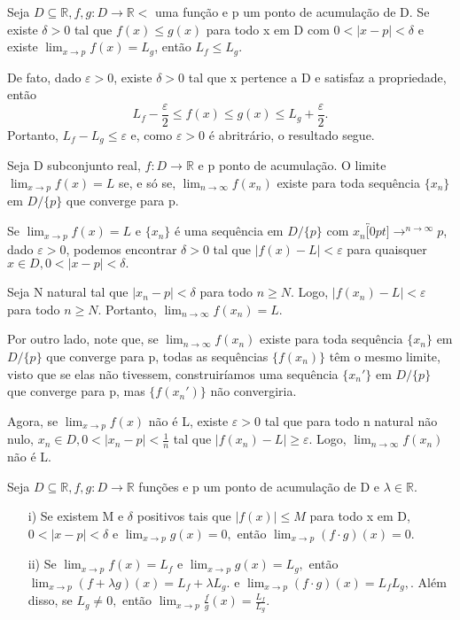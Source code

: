 \documentclass[analysis_notes.tex]{subfiles}
\begin{document}
\begin{theorem*}
	Seja $D\subseteq{\mathbb{R}}, f, g:D\rightarrow \mathbb{R}<$ uma fun\c c\~ao e p um ponto de acumula\c c\~ao de D. Se existe $\delta > 0$
	tal que $f(x)\leq{g(x)}$ para todo x em D com $0 <|x-p|<\delta$ e existe $\lim_{x\to p}f(x) = L_{g}$, ent\~ao $L_{f}\leq{L_{g}}.$
\end{theorem*}
\begin{proof*}
	De fato, dado $\varepsilon > 0$, existe $\delta > 0$ tal que x pertence a D e satisfaz a propriedade, ent\~ao
	$$
		L_{f} - \frac{\varepsilon}{2} \leq{f(x)}\leq{g(x)}\leq{L_{g}+\frac{\varepsilon}{2}.}
	$$
	Portanto, $L_{f}-L_{g}\leq{\varepsilon}$ e, como $\varepsilon > 0$ \'e abritr\'ario, o resultado segue. \qedsymbol
\end{proof*}
\begin{theorem*}
	Seja D subconjunto real, $f:D\rightarrow \mathbb{R}$ e p ponto de acumula\c c\~ao. O limite $\lim_{x\to p}f(x)=L$ se, e s\'o se,
	$\lim_{n\to\infty}f(x_{n})$ existe para toda sequ\^encia $\{x_{n}\}$ em $D/\{p\}$ que converge para p.
\end{theorem*}
\begin{proof*}
	Se $\lim_{x\to p }f(x) = L$ e $\{x_{n}\}$ \'e uma sequ\^encia em $D/\{p\}$ com $x_{n}\overbracket[0pt]{\longrightarrow}^{n\to \infty}p$, dado
	$\varepsilon > 0$, podemos encontrar $\delta > 0$ tal que $|f(x)-L|<\varepsilon$ para quaisquer $x\in D, 0<|x-p|<\delta.$

	Seja N natural tal que $|x_{n}-p|<\delta$ para todo $n\geq{N}.$ Logo, $|f(x_{n})-L| < \varepsilon$ para todo $n\geq{N}.$
	Portanto, $\lim_{n\to\infty}f(x_{n})=L.$

	Por outro lado, note que, se $\lim_{n\to\infty}f(x_{n})$ existe para toda sequ\^encia $\{x_{n}\}$ em $D/\{p\}$ que converge
	para p, todas as sequ\^encias $\{f(x_{n})\}$ t\^em o mesmo limite, visto que se elas n\~ao tivessem, construir\'iamos uma sequ\^encia
	$\{x_{n}'\}$ em $D/\{p\}$ que converge para p, mas $\{f(x_{n}')\}$ n\~ao convergiria.

	Agora, se $\lim_{x\to p}f(x)$ n\~ao \'e L, existe $\varepsilon > 0$ tal que para todo n natural n\~ao nulo, $x_{n}\in D, 0 <|x_{n}-p|<\frac{1}{n}$ tal
	que $|f(x_{n})-L|\geq{\varepsilon}$. Logo, $\lim_{n\to\infty}f(x_{n})$ n\~ao \'e L.\qedsymbol
\end{proof*}
\begin{theorem*}
	Seja $D\subseteq{\mathbb{R}}, f, g:D\rightarrow \mathbb{R}$ fun\c c\~oes e p um ponto de acumula\c c\~ao de D e $\lambda\in \mathbb{R}.$
	\begin{itemize}
		\item[i)] Se existem M e $\delta$ positivos tais que $|f(x)|\leq{M}$ para todo x em D, $0 <|x-p|<\delta$ e $\lim_{x\to p}g(x)=0,$
		      ent\~ao $\lim_{x\to p}(f \cdot g)(x) = 0.$
		\item[ii)] Se $\lim_{x\to p}f(x) = L_{f}$ e $\lim_{x\to p}g(x) = L_{g},$ ent\~ao $\lim_{x\to p}(f + \lambda g)(x) = L_{f} + \lambda L_{g}.$
		      e $\lim_{x\to p}(f \cdot g)(x) = L_{f}L_{g},$. Al\'em disso, se $L_{g}\neq0,$ ent\~ao $\lim_{x\to p}\frac{f}{g}(x) = \frac{L_{f}}{L_{g}}.$
	\end{itemize}
\end{theorem*}
\end{document}
